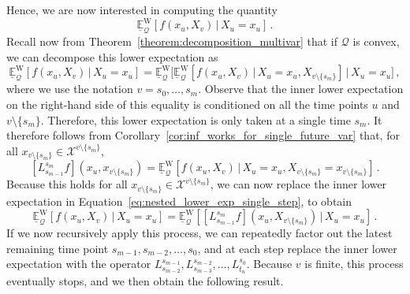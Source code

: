 \documentclass[10pt,a4paper]{paper}
\theoremstyle{definition}
\newtheorem{exmp}{Example}%
\newcommand{\states}{\mathcal{X}}
\newcommand{\processes}{\mathbb{P}}
\newcommand{\wprocesses}{\processes^{\mathrm{W}}}
\newcommand{\wmprocesses}{\processes^{\mathrm{WM}}}
\newcommand{\gambles}{\mathcal{L}}
\newcommand{\rateset}{\mathcal{Q}}
\newcommand{\exampleend}{\hfill$\Diamond$}
\begin{document}
Hence, we are now interested in computing the quantity
\begin{equation*}
\underline{\mathbb{E}}_\rateset^{\mathrm{W}}[f(x_u,X_v)\,\vert\,X_u=x_u]\,.
\end{equation*}
Recall now from Theorem~\ref{theorem:decomposition_multivar} that if $\rateset$ is convex, we can decompose this lower expectation as
\begin{equation}\label{eq:nested_lower_exp_single_step}
\underline{\mathbb{E}}_\rateset^{\mathrm{W}}[f(x_u,X_v)\,\vert\,X_u=x_u] = \underline{\mathbb{E}}_\rateset^{\mathrm{W}}\bigl[ \underline{\mathbb{E}}_\rateset^{\mathrm{W}}[f(x_u,X_v)\,\vert\,X_u=x_u,X_{v\setminus\{s_m\}}] \,\big\vert\,X_u=x_u\bigr]\,,
\end{equation}
where we use the notation $v=s_0,\ldots,s_m$. Observe that the inner lower expectation on the right-hand side of this equality is conditioned on all the time points $u$ and $v\setminus\{s_m\}$. Therefore, this lower expectation is only taken at a single time $s_m$. It therefore follows from Corollary~\ref{cor:inf_works_for_single_future_var} that, for all $x_{v\setminus\{s_m\}}\in\states^{v\setminus\{s_m\}}$,
\begin{equation*}
\left[L_{s_{m-1}}^{s_m}f\right]\left(x_u,x_{v\setminus\{s_m\}}\right) = \underline{\mathbb{E}}_\rateset^{\mathrm{W}}[f(x_u,X_v)\,\vert\,X_u=x_u,X_{v\setminus\{s_m\}}=x_{v\setminus\{s_m\}}]\,.
\end{equation*}
Because this holds for all $x_{v\setminus\{s_m\}}\in\states^{v\setminus\{s_m\}}$, we can now replace the inner lower expectation in Equation~\eqref{eq:nested_lower_exp_single_step}, to obtain
\begin{equation*}
\underline{\mathbb{E}}_\rateset^{\mathrm{W}}[f(x_u,X_v)\,\vert\,X_u=x_u] = \underline{\mathbb{E}}_\rateset^{\mathrm{W}}\left[ \left[L_{s_{m-1}}^{s_m}f\right]\left(x_u,X_{v\setminus\{s_m\}}\right) \,\big\vert\,X_u=x_u\right]\,.
\end{equation*}
If we now recursively apply this process, we can repeatedly factor out the latest remaining time point $s_{m-1}, s_{m-2},\ldots,s_{0}$, and at each step replace the inner lower expectation with the operator $L_{s_{m-2}}^{s_{m-1}},L_{s_{m-3}}^{s_{m-2}},\ldots,L_{t_n}^{s_0}$. Because $v$ is finite, this process eventually stops, and we then obtain the following result.

%
\end{document}
